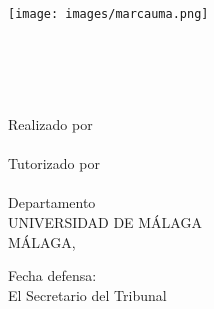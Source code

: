 \begin{center}
  \begin{figure*}[h]
    \centering
    \texttt{[image: images/marcauma.png]}
  \end{figure*}

  \MakeUppercase{\facultad} \\
  \MakeUppercase{\grado} \\
  \vspace{3cm}
  {\large	\tituloes} \\
  \ifdef{\subtituloes}{
    \textit{\subtituloes} \\
  }{}
  {\large	\tituloen} \\
  \ifdef{\subtituloen}{
    \textit{\subtituloen} \\
  }{}  \bigbreak
  Realizado por \\
  \textbf{\alumno} \\
  Tutorizado por \\
  \textbf{\tutor} \\
  Departamento \\
  \textbf{\departamento}
  \bigbreak
  UNIVERSIDAD DE MÁLAGA \\
  MÁLAGA, \fecha
\end{center}

\vfill

Fecha defensa: \\
El Secretario del Tribunal
